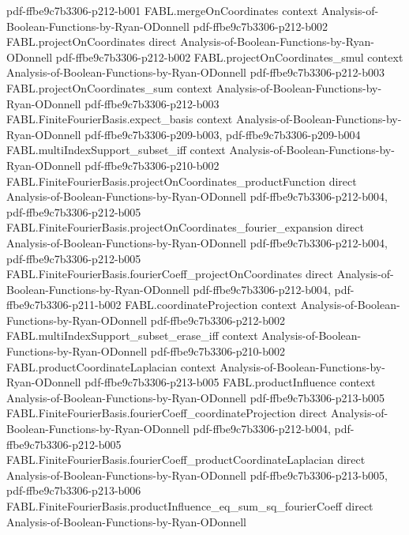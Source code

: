 \begin{theorem}
{    pdf-ffbe9c7b3306-p212-b001}
\proofstep
  {FABL.mergeOnCoordinates}
  {context}
  {Analysis-of-Boolean-Functions-by-Ryan-ODonnell}
  {pdf-ffbe9c7b3306-p212-b002}
\proofstep
  {FABL.projectOnCoordinates}
  {direct}
  {Analysis-of-Boolean-Functions-by-Ryan-ODonnell}
  {pdf-ffbe9c7b3306-p212-b002}
\proofstep
  {FABL.projectOnCoordinates_smul}
  {context}
  {Analysis-of-Boolean-Functions-by-Ryan-ODonnell}
  {pdf-ffbe9c7b3306-p212-b003}
\proofstep
  {FABL.projectOnCoordinates_sum}
  {context}
  {Analysis-of-Boolean-Functions-by-Ryan-ODonnell}
  {pdf-ffbe9c7b3306-p212-b003}
\proofstep
  {FABL.FiniteFourierBasis.expect_basis}
  {context}
  {Analysis-of-Boolean-Functions-by-Ryan-ODonnell}
  {pdf-ffbe9c7b3306-p209-b003,
    pdf-ffbe9c7b3306-p209-b004}
\proofstep
  {FABL.multiIndexSupport_subset_iff}
  {context}
  {Analysis-of-Boolean-Functions-by-Ryan-ODonnell}
  {pdf-ffbe9c7b3306-p210-b002}
\proofstep
  {FABL.FiniteFourierBasis.projectOnCoordinates_productFunction}
  {direct}
  {Analysis-of-Boolean-Functions-by-Ryan-ODonnell}
  {pdf-ffbe9c7b3306-p212-b004,
    pdf-ffbe9c7b3306-p212-b005}
\proofstep
  {FABL.FiniteFourierBasis.projectOnCoordinates_fourier_expansion}
  {direct}
  {Analysis-of-Boolean-Functions-by-Ryan-ODonnell}
  {pdf-ffbe9c7b3306-p212-b004,
    pdf-ffbe9c7b3306-p212-b005}
\proofstep
  {FABL.FiniteFourierBasis.fourierCoeff_projectOnCoordinates}
  {direct}
  {Analysis-of-Boolean-Functions-by-Ryan-ODonnell}
  {pdf-ffbe9c7b3306-p212-b004,
    pdf-ffbe9c7b3306-p211-b002}
\proofstep
  {FABL.coordinateProjection}
  {context}
  {Analysis-of-Boolean-Functions-by-Ryan-ODonnell}
  {pdf-ffbe9c7b3306-p212-b002}
\proofstep
  {FABL.multiIndexSupport_subset_erase_iff}
  {context}
  {Analysis-of-Boolean-Functions-by-Ryan-ODonnell}
  {pdf-ffbe9c7b3306-p210-b002}
\proofstep
  {FABL.productCoordinateLaplacian}
  {context}
  {Analysis-of-Boolean-Functions-by-Ryan-ODonnell}
  {pdf-ffbe9c7b3306-p213-b005}
\proofstep
  {FABL.productInfluence}
  {context}
  {Analysis-of-Boolean-Functions-by-Ryan-ODonnell}
  {pdf-ffbe9c7b3306-p213-b005}
\proofstep
  {FABL.FiniteFourierBasis.fourierCoeff_coordinateProjection}
  {direct}
  {Analysis-of-Boolean-Functions-by-Ryan-ODonnell}
  {pdf-ffbe9c7b3306-p212-b004,
    pdf-ffbe9c7b3306-p212-b005}
\proofstep
  {FABL.FiniteFourierBasis.fourierCoeff_productCoordinateLaplacian}
  {direct}
  {Analysis-of-Boolean-Functions-by-Ryan-ODonnell}
  {pdf-ffbe9c7b3306-p213-b005,
    pdf-ffbe9c7b3306-p213-b006}
\proofstep
  {FABL.FiniteFourierBasis.productInfluence_eq_sum_sq_fourierCoeff}
  {direct}
  {Analysis-of-Boolean-Functions-by-Ryan-ODonnell}

\end{theorem}
